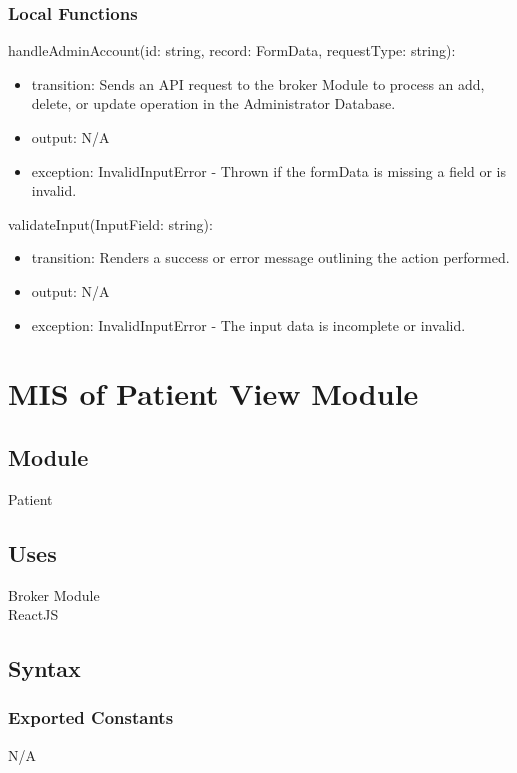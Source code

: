 \documentclass[12pt, titlepage]{article}
\begin{document}
\subsubsection{Local Functions}

\noindent handleAdminAccount(id: string, record: FormData, requestType: string):
\begin{itemize}
\item transition: Sends an API request to the broker Module to process an add, delete, or update operation in the Administrator Database.
\item output: N/A
\item exception: InvalidInputError - Thrown if the formData is missing a field or is invalid.
\end{itemize} 

\noindent validateInput(InputField: string):
\begin{itemize}
\item transition: Renders a success or error message outlining the action performed.
\item output: N/A
\item exception: InvalidInputError - The input data is incomplete or invalid.
\end{itemize}

\newpage

\section{MIS of Patient View Module} \label{Module_PatientView}

\subsection{Module}
Patient

\subsection{Uses}
Broker Module \\
ReactJS\\

\subsection{Syntax}

\subsubsection{Exported Constants}
N/A
\end{document}
